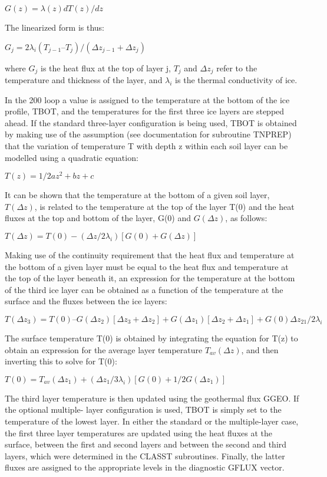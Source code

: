 $G(z) = \lambda(z) dT(z)/dz$

The linearized form is thus\+:

$G_j = 2 \lambda_i (T_{j-1} – T_j) / (\Delta z_{j-1} + \Delta z_j)$

where $G_j$ is the heat flux at the top of layer j, $T_j$ and $\Delta z_j$ refer to the temperature and thickness of the layer, and $\lambda_i$ is the thermal conductivity of ice.

In the 200 loop a value is assigned to the temperature at the bottom of the ice profile, T\+B\+O\+T, and the temperatures for the first three ice layers are stepped ahead. If the standard three-\/layer configuration is being used, T\+B\+O\+T is obtained by making use of the assumption (see documentation for subroutine T\+N\+P\+R\+E\+P) that the variation of temperature T with depth z within each soil layer can be modelled using a quadratic equation\+:

$T(z) = 1/2 a z^2 + b z +c$

It can be shown that the temperature at the bottom of a given soil layer, $T(\Delta z)$, is related to the temperature at the top of the layer T(0) and the heat fluxes at the top and bottom of the layer, G(0) and $G(\Delta z)$, as follows\+:

$T(\Delta z) = T(0) - (\Delta z/ 2 \lambda_i)[G(0) + G(\Delta z)]$

Making use of the continuity requirement that the heat flux and temperature at the bottom of a given layer must be equal to the heat flux and temperature at the top of the layer beneath it, an expression for the temperature at the bottom of the third ice layer can be obtained as a function of the temperature at the surface and the fluxes between the ice layers\+:

$T(\Delta z_3) = T(0) – {G(\Delta z_2) [\Delta z_3 + \Delta z_2] + G(\Delta z_1) [\Delta z_2 + \Delta z_1] + G(0) \Delta z_{21}} / 2 \lambda_i$

The surface temperature T(0) is obtained by integrating the equation for T(z) to obtain an expression for the average layer temperature $T_{av}(\Delta z)$, and then inverting this to solve for T(0)\+:

$T(0) = T_{av}(\Delta z_1) + (\Delta z_1/ 3\lambda_i) [G(0) + 1/2 G(\Delta z_1)]$

The third layer temperature is then updated using the geothermal flux G\+G\+E\+O. If the optional multiple-\/ layer configuration is used, T\+B\+O\+T is simply set to the temperature of the lowest layer. In either the standard or the multiple-\/layer case, the first three layer temperatures are updated using the heat fluxes at the surface, between the first and second layers and between the second and third layers, which were determined in the C\+L\+A\+S\+S\+T subroutines. Finally, the latter fluxes are assigned to the appropriate levels in the diagnostic G\+F\+L\+U\+X vector.


